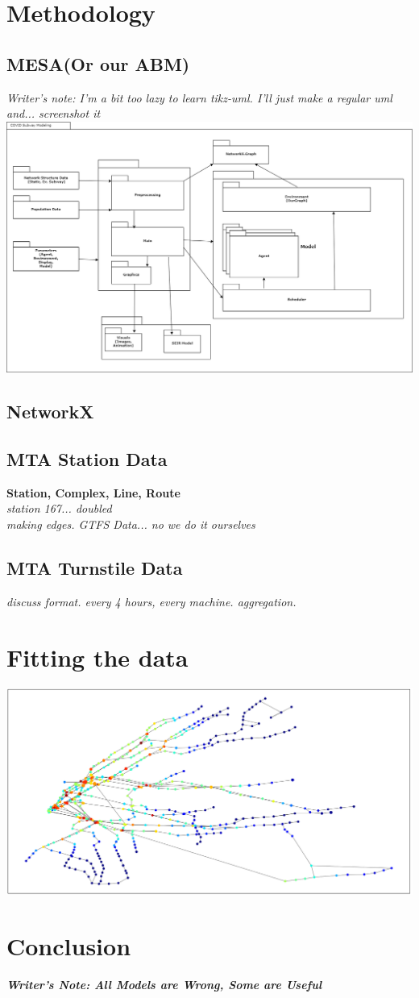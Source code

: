 \documentclass[12pt, a4, epsf] {article}
\theoremstyle{plain}
\theoremstyle{definition}
\begin{document}
\section*{Methodology}
\subsection*{MESA(Or our ABM)}
\textit{Writer's note: I'm a bit too lazy to learn tikz-uml. I'll just make a regular uml and... screenshot it\\}
\includegraphics[width = 1.0\textwidth]{Scratch_Visuals/covid_subway.png}
\subsection*{NetworkX}
\subsection*{MTA Station Data}
\textbf{Station, Complex, Line, Route\\}
\textit{station 167... doubled\\}
\textit{making edges. GTFS Data... no we do it ourselves\\}
\subsection*{MTA Turnstile Data}
\textit{discuss format. every 4 hours, every machine. aggregation.\\}
\section*{Fitting the data}
\includegraphics[width = 1.0\textwidth]{Scratch_Visuals/Preliminary_Modeling.png}
\section*{Conclusion}
\textbf{\textit{Writer's Note: All Models are Wrong, Some are Useful}}
\nocite{*}
{}

\end{document}
